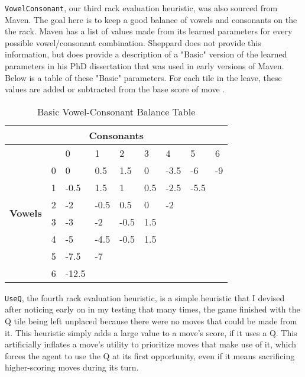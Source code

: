 \documentclass[letterpaper]{article}
\begin{document}
\texttt{VowelConsonant}, our third rack evaluation heuristic, was also sourced from Maven. The goal here is to keep a good balance of vowels and consonants on the the rack. Maven has a list of values made from its learned parameters for every possible vowel/consonant combination. Sheppard does not provide this information, but does provide a description of a "Basic" version of the learned parameters in his PhD dissertation that was used in early versions of Maven. Below is a table of these "Basic" parameters. For each tile in the leave, these values are added or subtracted from the base score of move \cite{2sheppard2002}.


\begin{table}[h]
\caption {Basic Vowel-Consonant Balance Table}
\begin{tabular}{|c|l|l|l|l|l|l|l|l|}
\hline
\multicolumn{9}{|c|}{\textbf{Consonants}}                                           \\ \hline
\multirow{8}{*}{\textbf{Vowels}} &   & 0     & 1    & 2    & 3   & 4    & 5    & 6  \\ \cline{2-9} 
                        & 0 & 0     & 0.5  & 1.5  & 0   & -3.5 & -6   & -9 \\ \cline{2-9} 
                        & 1 & -0.5  & 1.5  & 1    & 0.5 & -2.5 & -5.5 &    \\ \cline{2-9} 
                        & 2 & -2    & -0.5 & 0.5  & 0   & -2   &      &    \\ \cline{2-9} 
                        & 3 & -3    & -2   & -0.5 & 1.5 &      &      &    \\ \cline{2-9} 
                        & 4 & -5    & -4.5 & -0.5 & 1.5 &      &      &    \\ \cline{2-9} 
                        & 5 & -7.5  & -7   &      &     &      &      &    \\ \cline{2-9} 
                        & 6 & -12.5 &      &      &     &      &      &    \\ \hline
\end{tabular}
\end{table}

\texttt{UseQ}, the fourth rack evaluation heuristic, is a simple heuristic that I devised after noticing early on in my testing that many times, the game finished with the Q tile being left unplaced because there were no moves that could be made from it. This heuristic simply adds a large value to a move's score, if it uses a Q. This artificially inflates a move's utility to prioritize moves that make use of it, which forces the agent to use the Q at its first opportunity, even if it means sacrificing higher-scoring moves during its turn.
\end{document}
